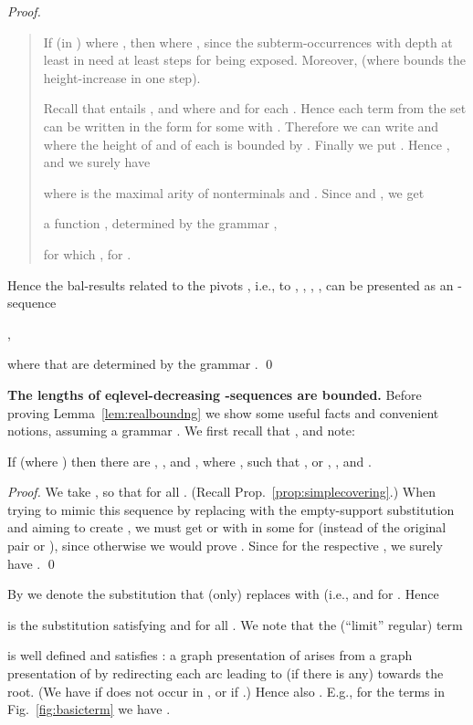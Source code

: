 \documentclass{llncs}
\begin{document}
\begin{proof}
\begin{quote}
{\small	
	If  (in ) 
	where ,
	then  where , since 
	the subterm-occurrences with depth at least  in 
	 need at least  steps for being exposed.
Moreover,  (where  bounds the 
height-increase in one step).
	
Recall that  entails 
, and 
 where  and 
 for each
.
Hence each term from the set  
can be written in the form
 for some  with 
.
Therefore we can write  and 
where the height of  and of each 
is bounded by .
Finally we put . Hence
, and we surely have

where  is the maximal arity of nonterminals and
.
Since  and
, we get
\begin{center}
a function , determined by the grammar , 
\end{center}
for which 
, for .
}
\end{quote}
Hence  the bal-results related to the pivots
, i.e.,
to , 
, , , can be presented as   an -sequence
\begin{center}
, 
\end{center}
where  that are determined by the
grammar . 
\qed
\end{proof}




\textbf{The lengths of eqlevel-decreasing -sequences are
bounded.}
Before proving Lemma~\ref{lem:realboundng}
we show
some useful facts and convenient notions, assuming a grammar
.
We first recall that ,
and note: 

\begin{proposition}\label{prop:bisimgetequation}
If 
(where )
then 
there are , ,
and , where , such that
,  or , , and
.
\end{proposition}

\begin{proof}
We take 
,
so that  for all .
(Recall Prop.~\ref{prop:simplecovering}.)
When trying to mimic this sequence by replacing 
 with the empty-support substitution and aiming to create
,
we must get  or  with 
in some  for 
(instead of the original pair  or
), 
since 
otherwise we would prove .
Since  for the respective , we surely have
.
\qed
\end{proof}

By  we denote the substitution that (only) replaces  with
 (i.e.,  and 
  for .
 Hence  

is the substitution  satisfying  and
 for all .
We note that the (``limit'' regular) term

is well defined and satisfies :
a graph presentation of  arises from
a graph presentation of  by redirecting each arc leading to  (if
there is any) towards the root. (We have  if  does not
occur in , or if .) Hence also
.
E.g., for the terms in Fig.~\ref{fig:basicterm} we have
.
\end{document}
